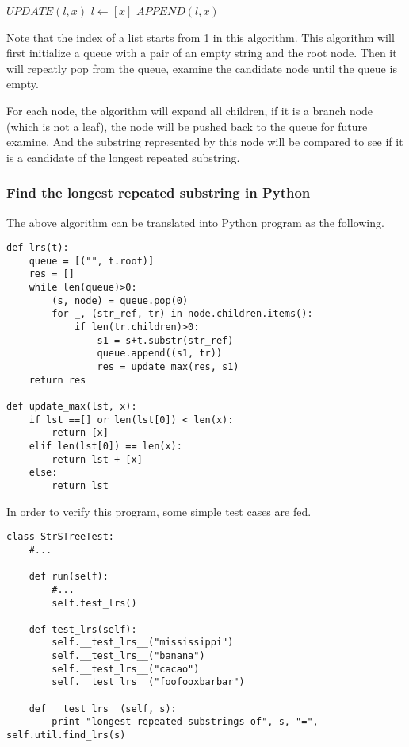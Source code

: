 \documentclass{article}
\begin{document}
\begin{algorithmic}
\STATE $UPDATE(l, x)$
    \RETURN $l \leftarrow [x]$
    \RETURN $APPEND(l, x)$
  \ENDIF
\end{algorithmic}

Note that the index of a list starts from 1 in this algorithm.
This algorithm will first initialize a queue with a pair of an
empty string and the root node. Then it will repeatly pop from
the queue, examine the candidate node until the queue is empty.

For each node, the algorithm will expand all children, if it is 
a branch node (which is not a leaf), the node will be pushed back
to the queue for future examine. And the substring represented
by this node will be compared to see if it is a candidate of the
longest repeated substring.

\subsubsection*{Find the longest repeated substring in Python}
The above algorithm can be translated into Python program as the following.

\lstset{language=Python}
\begin{lstlisting}
def lrs(t):
    queue = [("", t.root)]
    res = []
    while len(queue)>0:
        (s, node) = queue.pop(0)
        for _, (str_ref, tr) in node.children.items():
            if len(tr.children)>0:
                s1 = s+t.substr(str_ref)
                queue.append((s1, tr))
                res = update_max(res, s1)
    return res

def update_max(lst, x):
    if lst ==[] or len(lst[0]) < len(x):
        return [x]
    elif len(lst[0]) == len(x):
        return lst + [x]
    else:
        return lst
\end{lstlisting}

In order to verify this program, some simple test cases are fed.

\begin{lstlisting}
class StrSTreeTest:
    #...

    def run(self):
        #...
        self.test_lrs()

    def test_lrs(self):
        self.__test_lrs__("mississippi")
        self.__test_lrs__("banana")
        self.__test_lrs__("cacao")
        self.__test_lrs__("foofooxbarbar")

    def __test_lrs__(self, s):
        print "longest repeated substrings of", s, "=", self.util.find_lrs(s)
\end{lstlisting}
\end{document}
